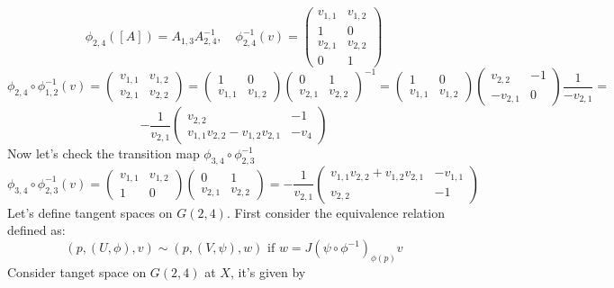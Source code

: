 \documentclass[11pt,a4paper]{report}
\begin{document}
$$ \phi_{2,4}([A]) = A_{1,3} A_{2,4}^{-1}, \quad \phi_{2,4}^{-1}(v) = 
\begin{pmatrix}
v_{1,1} & v_{1,2} \\
1 & 0 \\
v_{2,1} & v_{2,2} \\
0 & 1
\end{pmatrix}
$$
$$ \phi_{2,4} \circ \phi_{1,2}^{-1}(v) = 
\begin{pmatrix}
v_{1,1} & v_{1,2} \\
v_{2,1} & v_{2,2}
\end{pmatrix} =
\begin{pmatrix}
    1 & 0 \\
    v_{1,1} & v_{1,2}
\end{pmatrix}
\begin{pmatrix}
    0 & 1 \\
    v_{2,1} & v_{2,2}
\end{pmatrix} ^{-1}
= 
\begin{pmatrix}
    1 & 0 \\
    v_{1,1} & v_{1,2}
\end{pmatrix}
\begin{pmatrix}
    v_{2,2} & -1 \\
    -v_{2,1} & 0
\end{pmatrix} \frac{1}{-v_{2,1}} = 
$$
$$ -\frac{1}{v_{2,1}} \begin{pmatrix} v_{2,2} & -1 \\ v_{1,1} v_{2,2} - v_{1,2} v_{2,1} & -v_{4} \end{pmatrix}
$$
\newline
Now let's check the transition map $ \phi_{3,4} \circ \phi_{2,3}^{-1} $ 
$$ \phi_{3,4} \circ \phi_{2,3}^{-1} (v) =
\begin{pmatrix} v_{1,1} &  v_{1,2} \\ 1 & 0 \end{pmatrix} 
\begin{pmatrix} 0 & 1 \\ v_{2,1} & v_{2,2} \end{pmatrix} = 
-\frac{1}{v_{2,1}} \begin{pmatrix} v_{1,1} v_{2,2} + v_{1,2} v_{2,1} & -v_{1,1} \\ v_{2,2} & -1 \end{pmatrix}
$$ 
Let's define tangent spaces on $G(2,4)$. 
First consider the equivalence relation defined as:
$$ (p, (U,\phi), v) \sim (p, (V, \psi), w) \text{ if } w = J( \psi \circ \phi^{-1})_{\phi(p)} v $$
Consider tanget space on $G(2,4)$ at $X$, it's given by 
\end{document}
